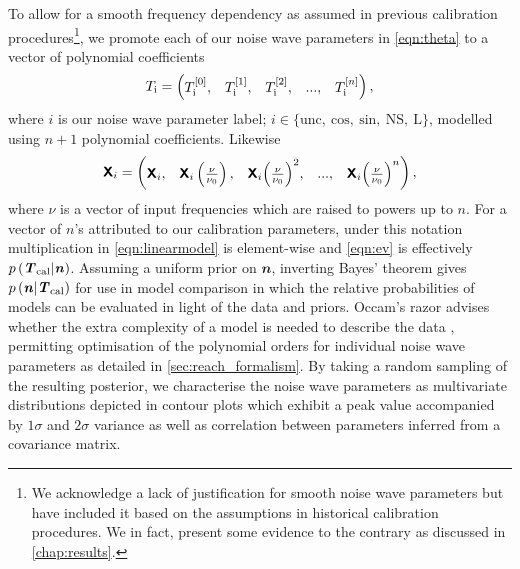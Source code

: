 To allow for a smooth frequency dependency as assumed in previous calibration procedures\footnote{We acknowledge a lack of justification for smooth noise wave parameters but have included it based on the assumptions in historical calibration procedures. We in fact, present some evidence to the contrary as discussed in \cref{chap:results}.}, we promote each of our noise wave parameters in \cref{eqn:theta} to a vector of polynomial coefficients
\begin{equation}
    T_{\mathrm{i}} = \begin{pmatrix}
    T_{\mathrm{i}}^{[0]}, & T_{\mathrm{i}}^{[1]}, & T_{\mathrm{i}}^{[2]}, & ..., & T_{\mathrm{i}}^{[n]}
    \end{pmatrix},
\end{equation}
where $i$ is our noise wave parameter label; $i \in \{\mathrm{unc, \ cos, \ sin , \ NS, \ L}\}$, modelled using $n+1$ polynomial coefficients. Likewise
\begin{equation}
    \textbf{\textsf{X}}_{i} = \begin{pmatrix}
    \textbf{\textsf{X}}_{i}, & \textbf{\textsf{X}}_{i}\left(\frac{\nu}{\nu_0}\right), & \textbf{\textsf{X}}_{i}{\left(\frac{\nu}{\nu_0}\right)}^2, & ..., &  \textbf{\textsf{X}}_{i}{\left(\frac{\nu}{\nu_0}\right)}^{n}
    \end{pmatrix},
\end{equation}
where $\nu$ is a vector of input frequencies which are raised to powers up to $n$. For a vector of $n$'s attributed to our calibration parameters, under this notation multiplication in \cref{eqn:linearmodel} is element-wise and \cref{eqn:ev} is effectively $p\left(\textbf{\textit{T}}_{\mathrm{cal}}|\textbf{\textit{n}}\right)$. Assuming a uniform prior on $\mathbfit{n}$, inverting Bayes' theorem gives $p\left(\textbf{\textit{n}}|\textbf{\textit{T}}_{\mathrm{cal}}\right)$ for use in model comparison in which the relative probabilities of models can be evaluated in light of the data and priors. Occam’s razor advises whether the extra complexity of a model is needed to describe the data \citep{trotta}, permitting optimisation of the polynomial orders for individual noise wave parameters as detailed in \cref{sec:reach_formalism}. By taking a random sampling of the resulting posterior, we characterise the noise wave parameters as multivariate distributions depicted in contour plots which exhibit a peak value accompanied by $1\sigma$ and $2\sigma$ variance as well as correlation between parameters inferred from a covariance matrix.


